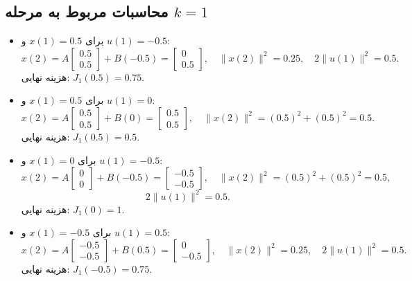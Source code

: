 \subsection*{محاسبات مربوط به مرحله \( k = 1 \)}
\begin{itemize}
	\item برای \( x(1) = 0.5 \) و \( u(1) = -0.5 \):
	\[
	x(2) = A \begin{bmatrix} 0.5 \\ 0.5 \end{bmatrix} + B(-0.5) = \begin{bmatrix} 0 \\ 0.5 \end{bmatrix}, \quad \|x(2)\|^2 = 0.25, \quad 2\|u(1)\|^2 = 0.5.
	\]
	هزینه نهایی: \( J_1(0.5) = 0.75 \).
	
	\item برای \( x(1) = 0.5 \) و \( u(1) = 0 \):
	\[
	x(2) = A \begin{bmatrix} 0.5 \\ 0.5 \end{bmatrix} + B(0) = \begin{bmatrix} 0.5 \\ 0.5 \end{bmatrix}, \quad \|x(2)\|^2 = (0.5)^2 + (0.5)^2 = 0.5.
	\]
	هزینه نهایی: \( J_1(0.5) = 0.5 \).
	
	\item برای \( x(1) = 0 \) و \( u(1) = -0.5 \):
	\[
	x(2) = A \begin{bmatrix} 0 \\ 0 \end{bmatrix} + B(-0.5) = \begin{bmatrix} -0.5 \\ -0.5 \end{bmatrix}, \quad \|x(2)\|^2 = (0.5)^2 + (0.5)^2 = 0.5, 
	\]
	\[
	2\|u(1)\|^2 = 0.5.
	\]
	هزینه نهایی: \( J_1(0) = 1 \).
	
	\item برای \( x(1) = -0.5 \) و \( u(1) = 0.5 \):
	\[
	x(2) = A \begin{bmatrix} -0.5 \\ -0.5 \end{bmatrix} + B(0.5) = \begin{bmatrix} 0 \\ -0.5 \end{bmatrix}, \quad \|x(2)\|^2 = 0.25, \quad 2\|u(1)\|^2 = 0.5.
	\]
	هزینه نهایی: \( J_1(-0.5) = 0.75 \).
\end{itemize}

